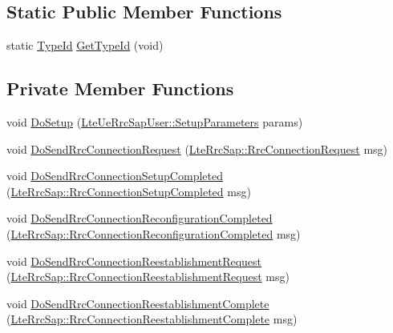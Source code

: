 \subsection*{Static Public Member Functions}
\begin{DoxyCompactItemize}
\item 
static \hyperlink{classns3_1_1TypeId}{Type\+Id} \hyperlink{classns3_1_1LteUeRrcProtocolReal_af045032b985cbb4ceb37f54b5949f2d3}{Get\+Type\+Id} (void)
\end{DoxyCompactItemize}
\subsection*{Private Member Functions}
\begin{DoxyCompactItemize}
\item 
void \hyperlink{classns3_1_1LteUeRrcProtocolReal_ab75a78a5ee55e6b44ef41d0940d34656}{Do\+Setup} (\hyperlink{structns3_1_1LteUeRrcSapUser_1_1SetupParameters}{Lte\+Ue\+Rrc\+Sap\+User\+::\+Setup\+Parameters} params)
\item 
void \hyperlink{classns3_1_1LteUeRrcProtocolReal_af1f7ba46dc2b2a1e13dcde81ec7afea4}{Do\+Send\+Rrc\+Connection\+Request} (\hyperlink{structns3_1_1LteRrcSap_1_1RrcConnectionRequest}{Lte\+Rrc\+Sap\+::\+Rrc\+Connection\+Request} msg)
\item 
void \hyperlink{classns3_1_1LteUeRrcProtocolReal_a519541e148a0a82685dffbd4682500b5}{Do\+Send\+Rrc\+Connection\+Setup\+Completed} (\hyperlink{structns3_1_1LteRrcSap_1_1RrcConnectionSetupCompleted}{Lte\+Rrc\+Sap\+::\+Rrc\+Connection\+Setup\+Completed} msg)
\item 
void \hyperlink{classns3_1_1LteUeRrcProtocolReal_a3f28203afd2430174ef52e0a37708ff1}{Do\+Send\+Rrc\+Connection\+Reconfiguration\+Completed} (\hyperlink{structns3_1_1LteRrcSap_1_1RrcConnectionReconfigurationCompleted}{Lte\+Rrc\+Sap\+::\+Rrc\+Connection\+Reconfiguration\+Completed} msg)
\item 
void \hyperlink{classns3_1_1LteUeRrcProtocolReal_adf2513495cb1627b2f2f902143640edd}{Do\+Send\+Rrc\+Connection\+Reestablishment\+Request} (\hyperlink{structns3_1_1LteRrcSap_1_1RrcConnectionReestablishmentRequest}{Lte\+Rrc\+Sap\+::\+Rrc\+Connection\+Reestablishment\+Request} msg)
\item 
void \hyperlink{classns3_1_1LteUeRrcProtocolReal_a9d4d572a16997f1f92e1150ff1911b25}{Do\+Send\+Rrc\+Connection\+Reestablishment\+Complete} (\hyperlink{structns3_1_1LteRrcSap_1_1RrcConnectionReestablishmentComplete}{Lte\+Rrc\+Sap\+::\+Rrc\+Connection\+Reestablishment\+Complete} msg)

\end{DoxyCompactItemize}
